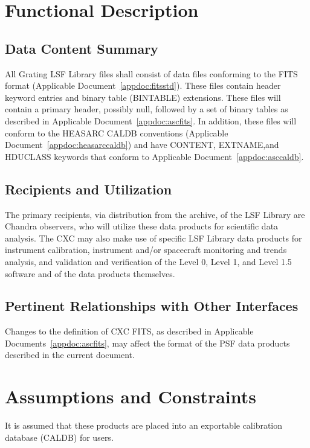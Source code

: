 \documentclass[twoside]{article}
\begin{document}
\section{Functional Description}

\subsection{Data Content Summary}

All Grating LSF Library files shall
consist of data files conforming to the FITS format (Applicable
Document~\ref{appdoc:fitsstd}). These files
contain header keyword entries and binary table (BINTABLE) extensions.
These files will contain a primary header, possibly null, followed
by a set of binary tables as described in Applicable
Document~\ref{appdoc:ascfits}. In addition, these files will conform to the 
HEASARC CALDB conventions (Applicable Document~\ref{appdoc:heasarccaldb}) and
have CONTENT, EXTNAME,and HDUCLASS keywords that conform to 
Applicable Document~\ref{appdoc:asccaldb}.


\subsection{Recipients and Utilization}

The primary recipients, via distribution from the archive, of the LSF
Library are Chandra observers, who will utilize these data products for
scientific data analysis. The CXC may also make use of specific LSF
Library data products for instrument calibration, instrument and/or
spacecraft monitoring and trends analysis, and validation and
verification of the Level 0, Level 1, and Level 1.5 software and of
the data products themselves.

\subsection{Pertinent Relationships with Other Interfaces}

Changes to the definition of CXC FITS, as described in Applicable
Documents~\ref{appdoc:ascfits}, may affect the format of the PSF data
products described in the current document.

\section{Assumptions and Constraints}

It is assumed that these products are placed into an exportable calibration database
(CALDB) for users. 
\end{document}
